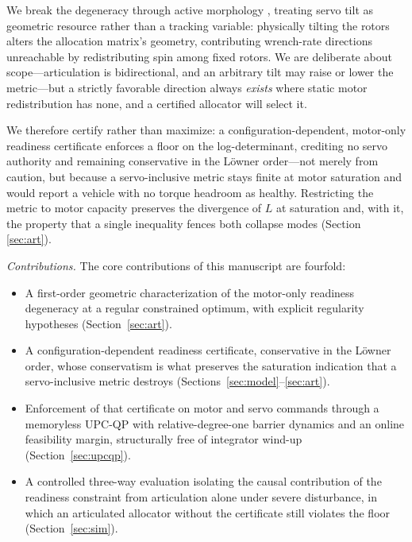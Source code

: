 \documentclass[letter, 10 pt, journal, twoside]{IEEEtran}
\theoremstyle{compact}
\begin{document}
We break the degeneracy through active morphology \cite{Rashad2020, Hamandi2021}, treating servo tilt as geometric resource rather than a tracking variable: physically tilting the rotors alters the allocation matrix's geometry, contributing wrench-rate directions unreachable by redistributing spin among fixed rotors. We are deliberate about scope---articulation is bidirectional, and an arbitrary tilt may raise or lower the metric---but a strictly favorable direction always \emph{exists} where static motor redistribution has none, and a certified allocator will select it.

We therefore certify rather than maximize: a configuration-dependent, motor-only readiness certificate enforces a floor on the log-determinant, crediting no servo authority and remaining conservative in the L\"owner order---not merely from caution, but because a servo-inclusive metric stays finite at motor saturation and would report a vehicle with no torque headroom as healthy. Restricting the metric to motor capacity preserves the divergence of $L$ at saturation and, with it, the property that a single inequality fences both collapse modes (Section \ref{sec:art}).

\emph{Contributions.} The core contributions of this manuscript are fourfold:
\begin{itemize}\itemsep1pt \parskip0pt 
    \item A first-order geometric characterization of the motor-only readiness degeneracy at a regular constrained optimum, with explicit regularity hypotheses (Section~\ref{sec:art}).
    \item A configuration-dependent readiness certificate, conservative in the L\"owner order, whose conservatism is what preserves the saturation indication that a servo-inclusive metric destroys (Sections~\ref{sec:model}--\ref{sec:art}).
    \item Enforcement of that certificate on motor and servo commands through a memoryless \ac{UPC-QP} with relative-degree-one barrier dynamics and an online feasibility margin, structurally free of integrator wind-up (Section~\ref{sec:upcqp}).
    \item A controlled three-way evaluation isolating the causal contribution of the readiness constraint from articulation alone under severe disturbance, in which an articulated allocator without the certificate still violates the floor (Section~\ref{sec:sim}).
\end{itemize}
\end{document}
